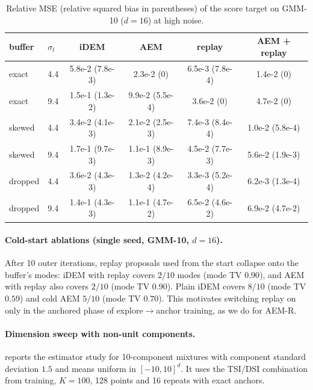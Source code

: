 \begin{table}[h]
\centering
\caption{Relative MSE (relative squared bias in parentheses) of the score target on GMM-10 ($d=16$) at high noise.}
\label{tab:replay}
\small
\begin{tabular}{llcccc}
\toprule
buffer & $\sigma_t$ & iDEM & AEM & replay & AEM + replay\\
\midrule
exact & 4.4 & 5.8e-2 (7.8e-3) & 2.3e-2 (0) & 6.5e-3 (7.8e-4) & 1.4e-2 (0)\\
exact & 9.4 & 1.5e-1 (1.3e-2) & 9.9e-2 (5.5e-4) & 3.6e-2 (0) & 4.7e-2 (0)\\
skewed & 4.4 & 3.4e-2 (4.1e-3) & 2.1e-2 (2.5e-3) & 7.4e-3 (8.4e-4) & 1.0e-2 (5.8e-4)\\
skewed & 9.4 & 1.7e-1 (9.7e-3) & 1.1e-1 (8.9e-3) & 4.5e-2 (7.7e-3) & 5.6e-2 (1.9e-3)\\
dropped & 4.4 & 3.6e-2 (4.3e-3) & 1.3e-2 (4.2e-4) & 3.3e-3 (5.2e-4) & 6.2e-3 (1.3e-4)\\
dropped & 9.4 & 1.4e-1 (4.3e-3) & 1.1e-1 (4.7e-2) & 6.5e-2 (4.6e-2) & 6.9e-2 (4.7e-2)\\
\bottomrule
\end{tabular}
\end{table}

\paragraph{Cold-start ablations (single seed, GMM-10, $d=16$).}
After 10 outer iterations, replay proposals used from the start collapse onto the buffer's modes: iDEM with replay covers $2/10$ modes (mode TV $0.90$), and AEM with replay also covers $2/10$ (mode TV $0.90$). Plain iDEM covers $8/10$ (mode TV $0.59$) and cold AEM $5/10$ (mode TV $0.70$).
This motivates switching replay on only in the anchored phase of explore$\to$anchor training, as we do for AEM-R.

\paragraph{Dimension sweep with non-unit components.}
 reports the estimator study for 10-component mixtures with component standard deviation $1.5$ and means uniform in $[-10,10]^d$. It uses the TSI/DSI combination from training, $K=100$, 128 points and 16 repeats with exact anchors.


